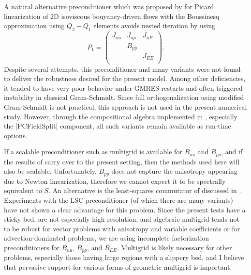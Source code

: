 A natural alternative preconditioner which was proposed by \citet{elman2011bouyancy} for Picard linearization of 2D isoviscous bouyancy-driven flows with the Boussinesq approximation using $Q_2-Q_1$ elements avoids nested iteration by using
\begin{equation*}
  P_1 =
  \begin{pmatrix}
    J_{uu} & J_{up} & J_{uE} \\
     & B_{pp} & \\
    & & J_{EE} \\
  \end{pmatrix} .
\end{equation*}
Despite several attempts, this preconditioner and many variants were not found to deliver the robustness desired for the present model.
Among other deficiencies, it tended to have very poor behavior under GMRES restarts and often triggered instability in classical Gram-Schmidt.
Since full orthogonalization using modified Gram-Schmidt is not practical, this approach is not used in the present numerical study.
However, through the compositional algebra implemented in {\PETSc}, especially the \cverb|PCFieldSplit| component, all such variants remain available as run-time options.

If a scalable preconditioner such as multigrid is available for $B_{uu}$ and $B_{pp}$, and if the results of \citet{olshanskii2006analysis} carry over to the present setting, then the methods used here will also be scalable.
Unfortunately, $B_{pp}$ does not capture the anisotropy appearing due to Newton linearization, therefore we cannot expect it to be spectrally equivalent to $S$.
An alternative is the least-squares commutator of \citet{elman2006bpb,elman1999bfbt} discussed in .
Experiments with the LSC preconditioner (of which there are many variants) have not shown a clear advantage for this problem.
Since the present tests have a sticky bed, are not especially high resolution, and algebraic multigrid tends not to be robust for vector problems with anisotropy and variable coefficients or for advection-dominated problems, we are using incomplete factorization preconditioners for $B_{uu}$, $B_{pp}$, and $B_{EE}$.
Multigrid is likely necessary for other problems, especially those having large regions with a slippery bed, and I believe that pervasive support for various forms of geometric multigrid is important.
